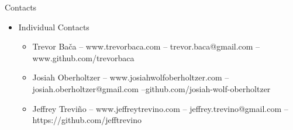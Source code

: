 \documentclass{beamer}
\begin{document}
\begin{frame}{Contacts}
  \begin{itemize}
  \item
    Individual Contacts
    \begin{itemize}
    \item
    Trevor Ba\v{c}a -- www.trevorbaca.com -- trevor.baca@gmail.com -- www.github.com/trevorbaca
    \item
    Josiah Oberholtzer -- www.josiahwolfoberholtzer.com -- josiah.oberholtzer@gmail.com --github.com/josiah-wolf-oberholtzer
      \item
  Jeffrey Trevi\~{n}o -- www.jeffreytrevino.com -- jeffrey.trevino@gmail.com -- https://github.com/jefftrevino
  \end{itemize}
  \end{itemize}
\end{frame}
\end{document}
